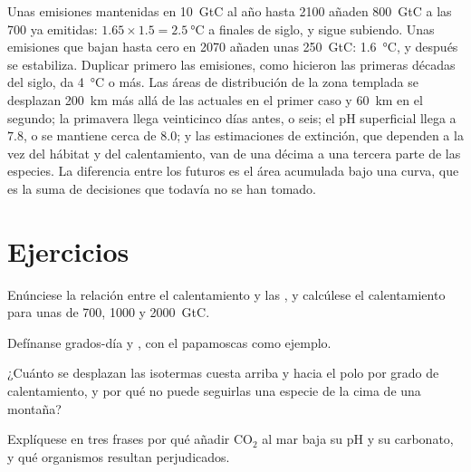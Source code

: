 \begin{example}\label{ex:b2:global-change:scenarios}
Unas emisiones mantenidas en \qty{10}{GtC} al año hasta 2100 añaden
\qty{800}{GtC} a las \qty{700}{} ya emitidas: $1.65\times 1.5 =
\qty{2.5}{\celsius}$ a finales de siglo, y sigue subiendo. Unas emisiones
que bajan hasta cero en 2070 añaden unas \qty{250}{GtC}: \qty{1.6}{\celsius},
y después se estabiliza. Duplicar primero las emisiones, como hicieron las
primeras décadas del siglo, da \qty{4}{\celsius} o más. Las áreas de
distribución de la zona templada se desplazan \qty{200}{km} más allá de las
actuales en el primer caso y \qty{60}{km} en el segundo; la primavera
llega veinticinco días antes, o seis; el pH superficial llega a $7.8$, o se
mantiene cerca de
$8.0$; y las estimaciones de extinción, que dependen a la vez del hábitat y
del calentamiento, van de una décima a una tercera parte de las especies.
La diferencia entre los futuros es el área acumulada bajo una curva, que es
la suma de decisiones que todavía no se han tomado.
\end{example}

\section{Ejercicios}

\begin{exercise}[$\star$]\label{exo:b2:global-change:1}
Enúnciese la relación entre el calentamiento y las , y
calcúlese el calentamiento para unas  de 700, 1000 y
\qty{2000}{GtC}.
\end{exercise}

\begin{exercise}[$\star$]\label{exo:b2:global-change:2}
Defínanse grados-día y , con el papamoscas como
ejemplo.
\end{exercise}

\begin{exercise}[$\star$]\label{exo:b2:global-change:3}
¿Cuánto se desplazan las isotermas cuesta arriba y hacia el polo por grado
de calentamiento, y por qué no puede seguirlas una especie de la cima de
una montaña?
\end{exercise}

\begin{exercise}[$\star$]\label{exo:b2:global-change:4}
Explíquese en tres frases por qué añadir \ensuremath{\mathrm{CO_2}} al mar baja su
pH y su carbonato, y qué organismos resultan perjudicados.
\end{exercise}

